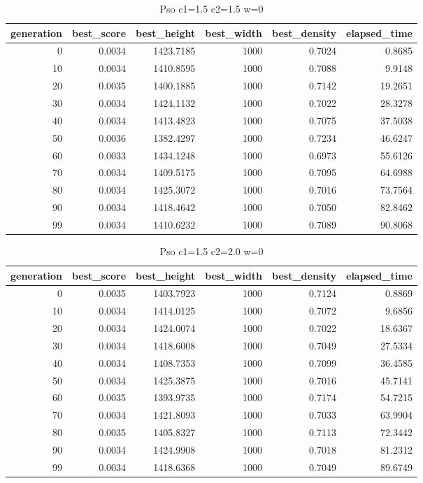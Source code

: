\begin{table}[htbp]
    \centering
    \caption{Pso c1=1.5 c2=1.5 w=0}
    \label{tab:pso_c1_1_5_c2_1_5_w_0}
    \begin{tabular}{rrrrrr}
    \toprule
    generation & best_score & best_height & best_width & best_density & elapsed_time \\
    \midrule
    0 & 0.0034 & 1423.7185 & 1000 & 0.7024 & 0.8685 \\
    10 & 0.0034 & 1410.8595 & 1000 & 0.7088 & 9.9148 \\
    20 & 0.0035 & 1400.1885 & 1000 & 0.7142 & 19.2651 \\
    30 & 0.0034 & 1424.1132 & 1000 & 0.7022 & 28.3278 \\
    40 & 0.0034 & 1413.4823 & 1000 & 0.7075 & 37.5038 \\
    50 & 0.0036 & 1382.4297 & 1000 & 0.7234 & 46.6247 \\
    60 & 0.0033 & 1434.1248 & 1000 & 0.6973 & 55.6126 \\
    70 & 0.0034 & 1409.5175 & 1000 & 0.7095 & 64.6988 \\
    80 & 0.0034 & 1425.3072 & 1000 & 0.7016 & 73.7564 \\
    90 & 0.0034 & 1418.4642 & 1000 & 0.7050 & 82.8462 \\
    99 & 0.0034 & 1410.6232 & 1000 & 0.7089 & 90.8068 \\
    \bottomrule
    \end{tabular}
\end{table}


\begin{table}[htbp]
    \centering
    \caption{Pso c1=1.5 c2=2.0 w=0}
    \label{tab:pso_c1_1_5_c2_2_0_w_0}
    \begin{tabular}{rrrrrr}
    \toprule
    generation & best_score & best_height & best_width & best_density & elapsed_time \\
    \midrule
    0 & 0.0035 & 1403.7923 & 1000 & 0.7124 & 0.8869 \\
    10 & 0.0034 & 1414.0125 & 1000 & 0.7072 & 9.6856 \\
    20 & 0.0034 & 1424.0074 & 1000 & 0.7022 & 18.6367 \\
    30 & 0.0034 & 1418.6008 & 1000 & 0.7049 & 27.5334 \\
    40 & 0.0034 & 1408.7353 & 1000 & 0.7099 & 36.4585 \\
    50 & 0.0034 & 1425.3875 & 1000 & 0.7016 & 45.7141 \\
    60 & 0.0035 & 1393.9735 & 1000 & 0.7174 & 54.7215 \\
    70 & 0.0034 & 1421.8093 & 1000 & 0.7033 & 63.9904 \\
    80 & 0.0035 & 1405.8327 & 1000 & 0.7113 & 72.3442 \\
    90 & 0.0034 & 1424.9908 & 1000 & 0.7018 & 81.2312 \\
    99 & 0.0034 & 1418.6368 & 1000 & 0.7049 & 89.6749 \\
    \bottomrule
    \end{tabular}
\end{table}


